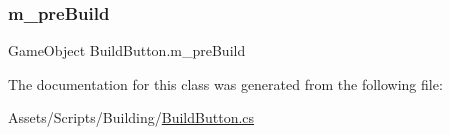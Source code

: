 \subsubsection{\texorpdfstring{m\_preBuild}{m\_preBuild}}
{\footnotesize\ttfamily Game\+Object Build\+Button.\+m\+\_\+pre\+Build}



The documentation for this class was generated from the following file\+:\begin{DoxyCompactItemize}
\item 
Assets/\+Scripts/\+Building/\mbox{\hyperlink{_build_button_8cs}{Build\+Button.\+cs}}\end{DoxyCompactItemize}
